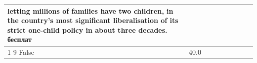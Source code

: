 \begin{table}[H]
\begin{tabular}{lllrlllll}
letting millions of families have two children, in the country's most significant liberalisation of its strict one-child policy in about three decades. бесплат \\
\cline{1-9}
False & 40.0%
\end{tabular}
\end{table}
